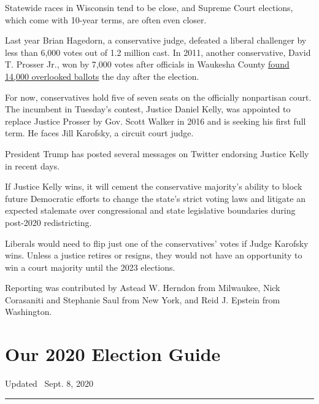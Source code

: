 Statewide races in Wisconsin tend to be close, and Supreme Court
elections, which come with 10-year terms, are often even closer.

Last year Brian Hagedorn, a conservative judge, defeated a liberal
challenger by less than 6,000 votes out of 1.2 million cast. In 2011,
another conservative, David T. Prosser Jr., won by 7,000 votes after
officials in Waukesha County
\href{https://www.nytimes3xbfgragh.onion/2011/04/13/us/13wisconsin.html}{found
14,000 overlooked ballots} the day after the election.

For now, conservatives hold five of seven seats on the officially
nonpartisan court. The incumbent in Tuesday's contest, Justice Daniel
Kelly, was appointed to replace Justice Prosser by Gov. Scott Walker in
2016 and is seeking his first full term. He faces Jill Karofsky, a
circuit court judge.

President Trump has posted several messages on Twitter endorsing Justice
Kelly in recent days.

If Justice Kelly wins, it will cement the conservative majority's
ability to block future Democratic efforts to change the state's strict
voting laws and litigate an expected stalemate over congressional and
state legislative boundaries during post-2020 redistricting.

Liberals would need to flip just one of the conservatives' votes if
Judge Karofsky wins. Unless a justice retires or resigns, they would not
have an opportunity to win a court majority until the 2023 elections.

Reporting was contributed by Astead W. Herndon from Milwaukee, Nick
Corasaniti and Stephanie Saul from New York, and Reid J. Epstein from
Washington.

\hypertarget{our-2020-election-guide}{%
\section{Our 2020 Election Guide}\label{our-2020-election-guide}}

Updated ~Sept. 8, 2020

\begin{center}\rule{0.5\linewidth}{\linethickness}\end{center}

